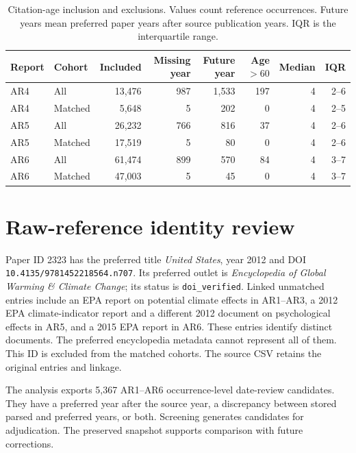 \documentclass[11pt,a4paper]{article}
\begin{document}
\begin{table}[htbp]
\centering\small
\caption{Citation-age inclusion and exclusions. Values count reference occurrences. Future years mean preferred paper years after source publication years. IQR is the interquartile range.}
\label{tab:age}
\begin{tabular}{llrrrrrr}
\toprule
Report & Cohort & Included & Missing year & Future year & Age $>60$ & Median & IQR\\
\midrule
AR4 & All & 13,476 & 987 & 1,533 & 197 & 4 & 2--6\\
AR4 & Matched & 5,648 & 5 & 202 & 0 & 4 & 2--5\\
AR5 & All & 26,232 & 766 & 816 & 37 & 4 & 2--6\\
AR5 & Matched & 17,519 & 5 & 80 & 0 & 4 & 2--6\\
AR6 & All & 61,474 & 899 & 570 & 84 & 4 & 3--7\\
AR6 & Matched & 47,003 & 5 & 45 & 0 & 4 & 3--7\\
\bottomrule
\end{tabular}
\end{table}





\section{Raw-reference identity review}\label{sec:identity}
Paper ID 2323 has the preferred title \emph{United States}, year 2012 and DOI \nolinkurl{10.4135/9781452218564.n707}. Its preferred outlet is \emph{Encyclopedia of Global Warming \& Climate Change}; its status is \texttt{doi\_verified}. Linked unmatched entries include an EPA report on potential climate effects in AR1--AR3, a 2012 EPA climate-indicator report and a different 2012 document on psychological effects in AR5, and a 2015 EPA report in AR6. These entries identify distinct documents. The preferred encyclopedia metadata cannot represent all of them. This ID is excluded from the matched cohorts. The source CSV retains the original entries and linkage.

The analysis exports 5,367 AR1--AR6 occurrence-level date-review candidates. They have a preferred year after the source year, a discrepancy between stored parsed and preferred years, or both. Screening generates candidates for adjudication. The preserved snapshot supports comparison with future corrections.
\end{document}
